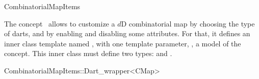 \ccRefPageBegin

\begin{ccRefConcept}{CombinatorialMapItems}

\ccDefinition
  
The concept \ccRefName\ allows to customize a $d$D combinatorial map
by choosing the type of darts, and by enabling and disabling some
attributes.  For that, it defines an inner class template named
, with one template parameter, , a model
of the  concept. This inner class must define
two types:  and .




\begin{ccClass}{CombinatorialMapItems::Dart_wrapper<CMap>}



\end{ccClass}
\end{ccRefConcept}
